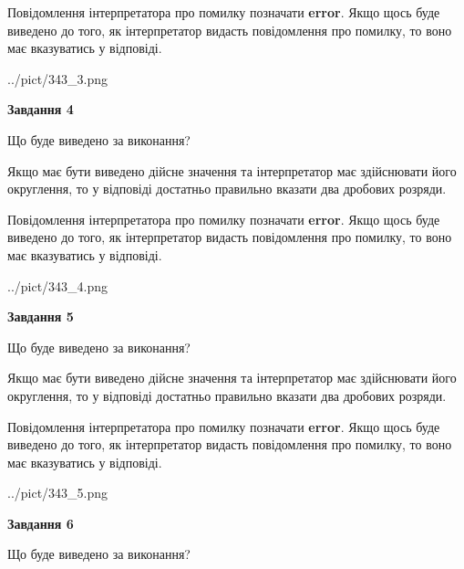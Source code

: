 \documentclass[12pt, ukrainian]{article}
\begin{document}
{\begin {Large}
Повідомлення інтерпретатора про помилку позначати \textbf{error}.
Якщо щось буде виведено до того, як інтерпретатор видасть повідомлення про помилку, 
то воно має вказуватись у відповіді. \par

\begin{center}
	{../pict/343_3.png}
\end{center}
\newpage

{\begin {center}\textbf{Завдання 4}\end {center}}\par
Що буде виведено за виконання? \par

Якщо має бути виведено дійсне значення та інтерпретатор має здійснювати його округлення, 
то у відповіді достатньо правильно вказати два дробових розряди.

Повідомлення інтерпретатора про помилку позначати \textbf{error}.
Якщо щось буде виведено до того, як інтерпретатор видасть повідомлення про помилку, 
то воно має вказуватись у відповіді. \par

\begin{center}
	{../pict/343_4.png}
\end{center}
\newpage

{\begin {center}\textbf{Завдання 5}\end {center}}\par
Що буде виведено за виконання? \par

Якщо має бути виведено дійсне значення та інтерпретатор має здійснювати його округлення, 
то у відповіді достатньо правильно вказати два дробових розряди.

Повідомлення інтерпретатора про помилку позначати \textbf{error}.
Якщо щось буде виведено до того, як інтерпретатор видасть повідомлення про помилку, 
то воно має вказуватись у відповіді. \par

\begin{center}
	{../pict/343_5.png}
\end{center}
\newpage

{\begin {center}\textbf{Завдання 6}\end {center}}\par
Що буде виведено за виконання? \par


\end{Large}}
\end{document}
